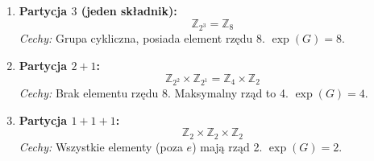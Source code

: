 \begin{enumerate}
    \item \textbf{Partycja $3$ (jeden składnik):}
        \[ \mathbb{Z}_{2^3} = \mathbb{Z}_8 \]
        \textit{Cechy:} Grupa cykliczna, posiada element rzędu 8. $\exp(G)=8$.

    \item \textbf{Partycja $2+1$:}
        \[ \mathbb{Z}_{2^2} \times \mathbb{Z}_{2^1} = \mathbb{Z}_4 \times \mathbb{Z}_2 \]
        \textit{Cechy:} Brak elementu rzędu 8. Maksymalny rząd to 4. $\exp(G)=4$.

    \item \textbf{Partycja $1+1+1$:}
        \[ \mathbb{Z}_2 \times \mathbb{Z}_2 \times \mathbb{Z}_2 \]
        \textit{Cechy:} Wszystkie elementy (poza $e$) mają rząd 2. $\exp(G)=2$.
\end{enumerate}

